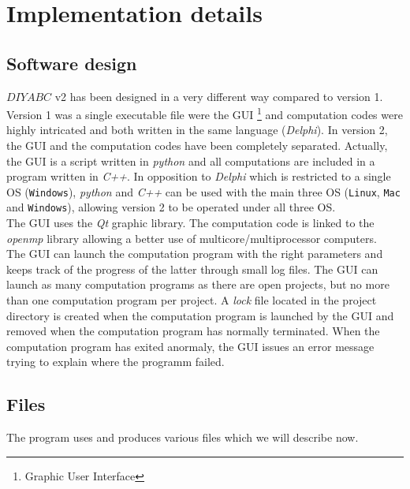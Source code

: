 \clearpage
 \section{Implementation details}
\subsection{Software design}
$DIYABC$ v2 has been designed in a very different way compared to version 1. Version 1 was a single executable file were the GUI \footnote{Graphic User Interface} and computation codes were highly intricated and both written in the same language (\emph{Delphi}). In version 2, the GUI and the computation codes have been completely separated. Actually, the GUI is a script written in \emph{python} and all computations are included in a program written in \emph{C++}. In opposition to \emph{Delphi} which is restricted to a single OS (\texttt{Windows}), \textit{python} and \textit{C++} can be used with the main three OS (\texttt{Linux}, \texttt{Mac} and \texttt{Windows}), allowing version 2  to be operated under all three OS.\\
The GUI uses the \textit{Qt} graphic library. The computation code is linked to the \textit{openmp} library allowing a better use of multicore/multiprocessor computers.\\
The GUI can launch the computation program with the right parameters and keeps track of the progress of the latter through small log files. The GUI can launch as many computation programs as there are open projects, but no more than one computation program per project. A \textit{lock} file located in the project directory is created when the computation program is launched by the GUI and removed when the computation program has normally terminated. When the computation program has exited anormaly, the GUI issues an error message trying to explain where the programm failed.    
\subsection{Files}
The program uses and produces various files which we will describe now.
